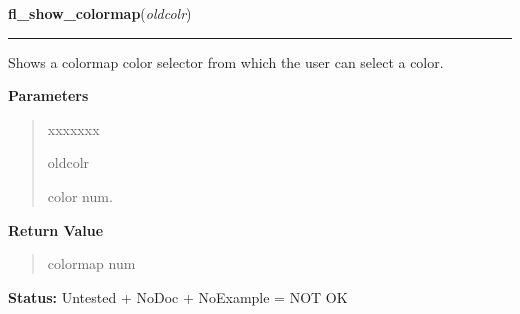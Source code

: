    \label{xformslib:library:fl_show_colormap}

    \vspace{0.5ex}

\hspace{.8\funcindent}\begin{boxedminipage}{\funcwidth}

    \raggedright \textbf{fl\_show\_colormap}(\textit{oldcolr})

    \vspace{-1.5ex}

    \rule{\textwidth}{0.5\fboxrule}
\setlength{\parskip}{2ex}
    Shows a colormap color selector from which the user can select a color.

\setlength{\parskip}{1ex}
      \textbf{Parameters}
      \vspace{-1ex}

      \begin{quote}
        \begin{Ventry}{xxxxxxx}

          \item[oldcolr]

          color num.

        \end{Ventry}

      \end{quote}

      \textbf{Return Value}
    \vspace{-1ex}

      \begin{quote}
      colormap num

      \end{quote}

\textbf{Status:} Untested + NoDoc + NoExample = NOT OK



    \end{boxedminipage}

    \label{xformslib:library:fl_show_choices}

    \vspace{0.5ex}

